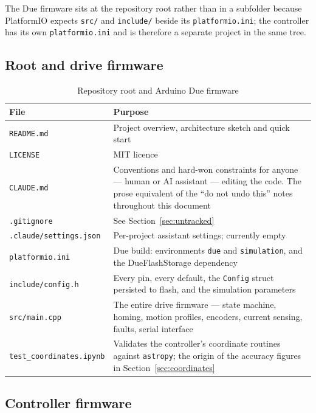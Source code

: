 \documentclass[11pt,a4paper]{article}
\begin{document}
The Due firmware sits at the repository root rather than in a subfolder because PlatformIO expects \texttt{src/} and \texttt{include/} beside its \texttt{platformio.ini}; the controller has its own \texttt{platformio.ini} and is therefore a separate project in the same tree.

\subsection{Root and drive firmware}

\begin{table}[H]
\centering
\caption{Repository root and Arduino Due firmware}
\small
\begin{tabular}{lp{9.4cm}}
\toprule
\textbf{File} & \textbf{Purpose} \\
\midrule
\texttt{README.md} & Project overview, architecture sketch and quick start \\
\texttt{LICENSE} & MIT licence \\
\texttt{CLAUDE.md} & Conventions\index{CLAUDE.md@\texttt{CLAUDE.md}} and hard-won constraints for anyone --- human or AI assistant --- editing the code. The prose equivalent of the ``do not undo this'' notes throughout this document \\
\texttt{.gitignore} & See Section~\ref{sec:untracked} \\
\texttt{.claude/settings.json} & Per-project assistant settings; currently empty \\
\texttt{platformio.ini} & Due build: environments \texttt{due} and \texttt{simulation}, and the DueFlashStorage dependency \\
\texttt{include/config.h} & Every pin, every default, the \texttt{Config} struct persisted to flash, and the simulation parameters \\
\texttt{src/main.cpp} & The entire drive firmware --- state machine, homing, motion profiles, encoders, current sensing, faults, serial interface \\
\texttt{test\_coordinates.ipynb} & Validates the controller's coordinate routines against \texttt{astropy}; the origin of the accuracy figures in Section~\ref{sec:coordinates} \\
\bottomrule
\end{tabular}
\end{table}

\subsection{Controller firmware}
\end{document}
